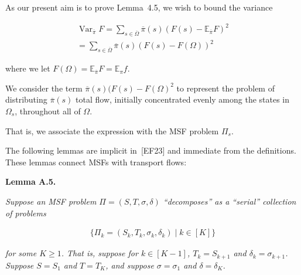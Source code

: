 \documentclass[10pt,a4paper]{article}
\begin{document}
As our present aim is to prove Lemma 4.5, we wish to bound the variance\par


\[\begin{gathered}
\displaystyle\operatorname{Var}_{\overline{\pi}}F \displaystyle=\sum_{s\in\overline{\Omega}}\overline{\pi}(s)(F(s)-\mathbb{E}_{\overline{\pi}}F)^{2} \\
\displaystyle=\sum_{s\in\overline{\Omega}}\overline{\pi}(s)(F(s)-F(\Omega))^{2}
\end{gathered}\]


where we let $F(\Omega)=\mathbb{E}_{\overline{\pi}}F=\mathbb{E}_{\pi}f$.\par




We consider the term $\overline{\pi}(s)(F(s)-F(\Omega)^{2}$ to represent the problem of distributing $\overline{\pi}(s)$ total flow, initially concentrated evenly among the states in $\Omega_{s}$, throughout all of $\Omega$.\par




That is, we associate the expression with the MSF problem $\Pi_{s}$.\par




The following lemmas are implicit in [EF23] and immediate from the definitions. These lemmas connect MSFs with transport flows:\par





\par\medskip\noindent\textbf{\textbf{Lemma A.5}\textbf{.}}\par



\emph{Suppose an MSF problem $\Pi=(S,T,\sigma,\delta)$ “decomposes” as a “serial” collection of problems}\par


\[\begin{gathered}
\{\Pi_{k}=(S_{k},T_{k},\sigma_{k},\delta_{k})\mid k\in[K]\}
\end{gathered}\]


\emph{for some $K\geq 1$. That is, suppose for $k\in[K-1]$, $T_{k}=S_{k+1}$ and $\delta_{k}=\sigma_{k+1}$. Suppose $S=S_{1}$ and $T=T_{K}$, and suppose $\sigma=\sigma_{1}$ and $\delta=\delta_{K}$.}\par
\end{document}
